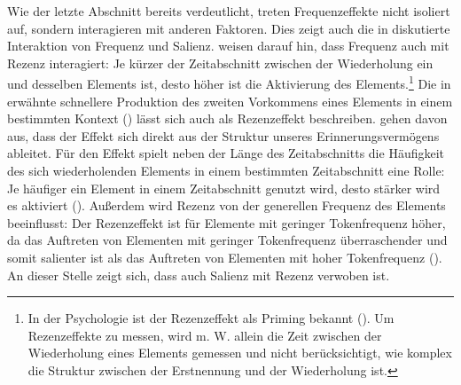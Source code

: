 Wie der letzte Abschnitt bereits verdeutlicht, treten Frequenzeffekte nicht isoliert auf, sondern interagieren mit anderen Faktoren. Dies zeigt auch die in  diskutierte Interaktion von Frequenz und Salienz. \textcite[6--8]{Pfander.2016} weisen darauf hin, dass Frequenz auch mit Rezenz interagiert: Je kürzer der Zeitabschnitt zwischen der Wiederholung ein und desselben Elements ist, desto höher ist die Aktivierung des Elements.\footnote{In der Psychologie ist der Rezenzeffekt als Priming bekannt (\cite[14--15]{Ellis.2012}). Um Rezenzeffekte zu messen, wird m. W. allein die Zeit zwischen der Wiederholung eines Elements gemessen und nicht berücksichtigt, wie komplex die Struktur zwischen der Erstnennung und der Wiederholung ist.} Die in  erwähnte schnellere Produktion des zweiten Vorkommens eines Elements in einem bestimmten Kontext (\cite{Fowler.1987}) lässt sich auch als Rezenzeffekt beschreiben. \textcite[7]{Pfander.2016} gehen davon aus, dass der Effekt sich direkt aus der Struktur unseres Erinnerungsvermögens ableitet. Für den Effekt spielt neben der Länge des Zeitabschnitts die Häufigkeit des sich wiederholenden Elements in einem bestimmten Zeitabschnitt eine Rolle: Je häufiger ein Element in einem Zeitabschnitt genutzt wird, desto stärker wird es aktiviert (\cite[6--8]{Pfander.2016}). Außerdem wird Rezenz von der generellen Frequenz des Elements beeinflusst: Der Rezenzeffekt ist für Elemente mit geringer Tokenfrequenz höher, da das Auftreten von Elementen mit geringer Tokenfrequenz überraschender und somit salienter ist als das Auftreten von Elementen mit hoher Tokenfrequenz (\cite[6--8]{Pfander.2016}). An dieser Stelle zeigt sich, dass auch Salienz mit Rezenz verwoben ist.  

